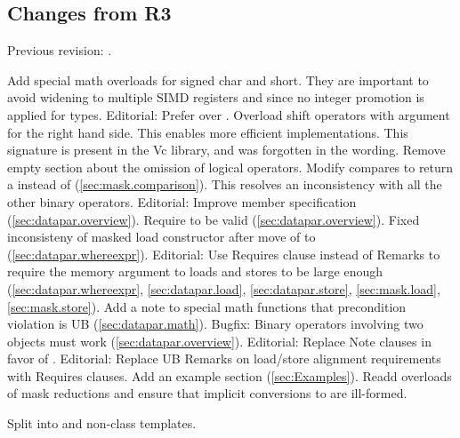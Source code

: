 \subsection{Changes from R3}
Previous revision: \parencite{P0214R3}.
\begin{itemize}
  \chck Add special math overloads for signed char and short.
        They are important to avoid widening to multiple SIMD registers and since no integer promotion is applied for \datapar types.
  \chck Editorial: Prefer  over .
  \chck Overload shift operators with \intt argument for the right hand side.
        This enables more efficient implementations.
        This signature is present in the Vc library, and was forgotten in the wording.
  \chck Remove empty section about the omission of logical operators.
  \chck Modify \mask compares to return a \mask instead of \bool (\ref{sec:mask.comparison}).
        This resolves an inconsistency with all the other binary operators.
  \chck Editorial: Improve  member specification (\ref{sec:datapar.overview}).
  \chck Require  to be valid (\ref{sec:datapar.overview}).
  \chck Fixed inconsisteny of masked load constructor after move of  to  (\ref{sec:datapar.whereexpr}).
  \chck Editorial: Use Requires clause instead of Remarks to require the memory argument to loads and stores to be large enough (\ref{sec:datapar.whereexpr}, \ref{sec:datapar.load}, \ref{sec:datapar.store}, \ref{sec:mask.load}, \ref{sec:mask.store}).
  \chck Add a note to special math functions that precondition violation is UB (\ref{sec:datapar.math}).
  \chck Bugfix: Binary operators involving two  objects must work (\ref{sec:datapar.overview}).
  \chck Editorial: Replace Note clauses in favor of \wgNote{}.
  \chck Editorial: Replace UB Remarks on load/store alignment requirements with Requires clauses.
  \chck Add an example section (\ref{sec:Examples}).
  \chck Readd \bool overloads of mask reductions and ensure that implicit conversions to \bool are ill-formed.

  \todo Split \whereexpression into \const and non-\const class templates.
\end{itemize}








